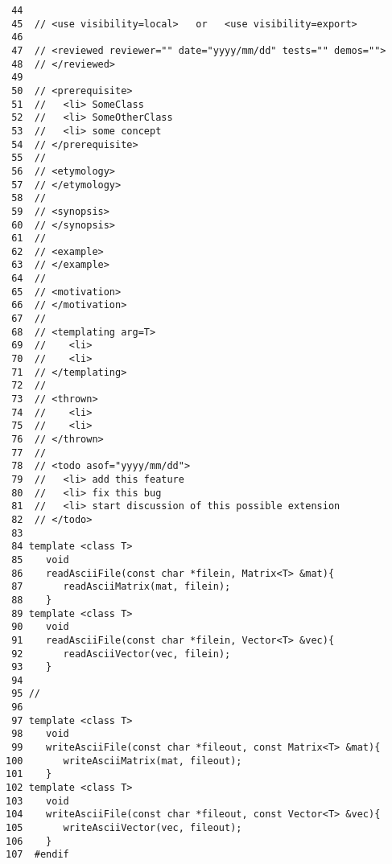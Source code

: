 \begin{verbatim}
 44
 45  // <use visibility=local>   or   <use visibility=export>
 46
 47  // <reviewed reviewer="" date="yyyy/mm/dd" tests="" demos="">
 48  // </reviewed>
 49
 50  // <prerequisite>
 51  //   <li> SomeClass
 52  //   <li> SomeOtherClass
 53  //   <li> some concept
 54  // </prerequisite>
 55  //
 56  // <etymology>
 57  // </etymology>
 58  //
 59  // <synopsis>
 60  // </synopsis>
 61  //
 62  // <example>
 63  // </example>
 64  //
 65  // <motivation>
 66  // </motivation>
 67  //
 68  // <templating arg=T>
 69  //    <li>
 70  //    <li>
 71  // </templating>
 72  //
 73  // <thrown>
 74  //    <li>
 75  //    <li>
 76  // </thrown>
 77  //
 78  // <todo asof="yyyy/mm/dd">
 79  //   <li> add this feature
 80  //   <li> fix this bug
 81  //   <li> start discussion of this possible extension
 82  // </todo>
 83
 84 template <class T>
 85    void
 86    readAsciiFile(const char *filein, Matrix<T> &mat){
 87       readAsciiMatrix(mat, filein);
 88    }
 89 template <class T>
 90    void
 91    readAsciiFile(const char *filein, Vector<T> &vec){
 92       readAsciiVector(vec, filein);
 93    }
 94 
 95 //
 96 
 97 template <class T>
 98    void
 99    writeAsciiFile(const char *fileout, const Matrix<T> &mat){
100       writeAsciiMatrix(mat, fileout);
101    }
102 template <class T>
103    void
104    writeAsciiFile(const char *fileout, const Vector<T> &vec){
105       writeAsciiVector(vec, fileout);
106    }
107  #endif
\end{verbatim}
